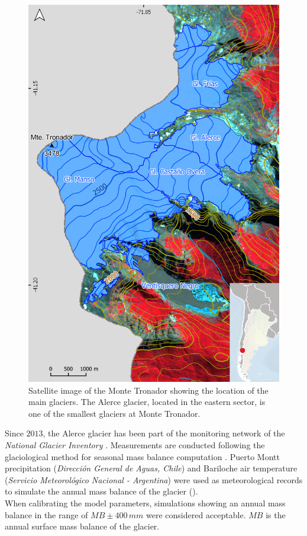 \begin{figure}[htbp]
  \centering
  \includegraphics[scale = 0.6]{alerce_map}
  \caption{Satellite image of the Monte Tronador showing the location of the main glaciers. The Alerce
  glacier, located in the eastern sector, is one of the smallest glaciers at Monte Tronador.}
  \label{fig:alerce_map}
\end{figure}

Since $2013$, the Alerce glacier has been part of the monitoring network of the \textit{National Glacier Inventory}
\citep{ing_fundamentos:2010}. Measurements are conducted following the glaciological method for seasonal mass balance
computation \citep{kaser_manual:2003}. Puerto Montt precipitation (\textit{Dirección General de Aguas, Chile}) 
and Bariloche air temperature (\textit{Servicio Meteorológico Nacional - Argentina}) were used as meteorological 
records to simulate the annual mass balance of the glacier ().\\
When calibrating the model parameters, simulations showing an annual mass balance in the range of $MB \pm 400 \, mm$ were
considered acceptable. $MB$ is the annual surface mass balance of the glacier.

